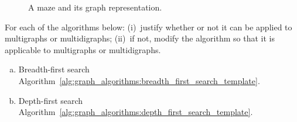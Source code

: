 \begin{problem}
\begin{figure}[!htbp]
\centering
{}
\qquad
{}
\caption{A maze and its graph representation.}
\label{fig:graph_algorithms:maze_associated_graph}
\end{figure}

\item For each of the algorithms below: (i)~justify whether or not
  it can be applied to multigraphs or multidigraphs; (ii)~if not,
  modify the algorithm so that it is applicable to multigraphs or
  multidigraphs.
  \begin{enumerate}[(a)]
  \item Breadth-first search
    Algorithm~\ref{alg:graph_algorithms:breadth_first_search_template}.

  \item Depth-first search
    Algorithm~\ref{alg:graph_algorithms:depth_first_search_template}.


\end{enumerate}
\end{problem}
